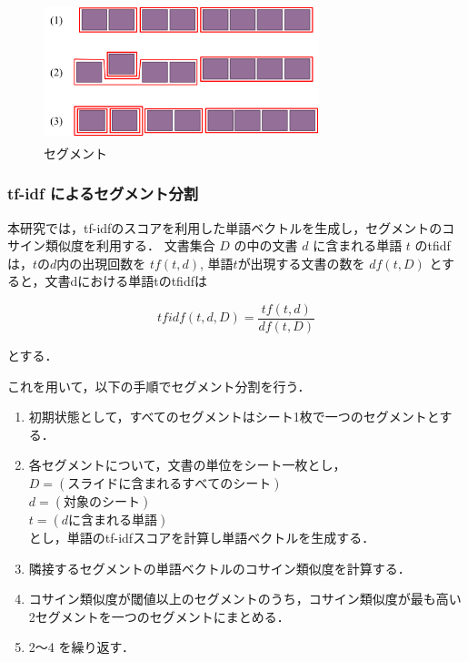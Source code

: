 \documentclass{js}
\begin{document}
\begin{figure}[tb]
 \begin{center}
  \includegraphics[width=80mm,height=40mm]{slide_segment.png}
 \end{center}
 \caption{セグメント}
 \label{fig:segment}
\end{figure}


\subsubsection{tf-idf によるセグメント分割}

本研究では，tf-idfのスコアを利用した単語ベクトルを生成し，セグメントのコサイン類似度を利用する．
文書集合 $D$ の中の文書 $d$ に含まれる単語 $t$ のtfidfは，$t$の$d$内の出現回数を $tf(t, d)$,
単語$t$が出現する文書の数を $df(t, D)$ とすると，文書dにおける単語tのtfidfは

\begin{equation}
 tfidf(t, d, D) = \frac{tf(t, d)}{df(t, D)}
\end{equation}

とする．

これを用いて，以下の手順でセグメント分割を行う．

\begin{enumerate}
 \item 初期状態として，すべてのセグメントはシート1枚で一つのセグメントとする．
 \item 各セグメントについて，文書の単位をシート一枚とし，\\
$D = (スライドに含まれるすべてのシート)$\\
$d = (対象のシート)$\\
$t = (dに含まれる単語)$\\
 とし，単語のtf-idfスコアを計算し単語ベクトルを生成する．
 \item 隣接するセグメントの単語ベクトルのコサイン類似度を計算する．
 \item コサイン類似度が閾値以上のセグメントのうち，コサイン類似度が最も高い2セグメントを一つのセグメントにまとめる．
 \item 2〜4 を繰り返す．
\end{enumerate}
\end{document}
